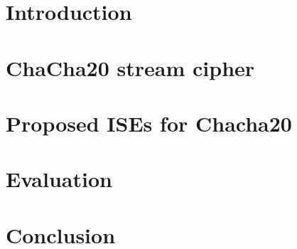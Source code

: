 \documentclass[conference]{IEEEtran}
\begin{document}




\section{Introduction}
\label{sec:intro}


\section{ChaCha20 stream cipher}
\label{sec:bg}


\section{Proposed ISEs for Chacha20}
\label{sec:ise}


\section{Evaluation}
\label{sec:res}


\section{Conclusion}
\label{sec:outro}




%
%
%




%
\end{document}
